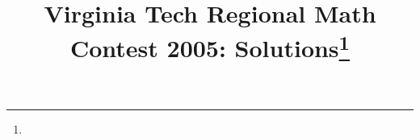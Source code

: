 \documentclass[10pt]{article}
\begin{document}
\title{Virginia Tech Regional Math Contest 2005: Solutions\footnote{\disclaimer}}
\author{\vspace{-2ex}}
\date{\vspace{-5ex}} %
\maketitle

%

%

%

%

%

%

%
\end{document}
